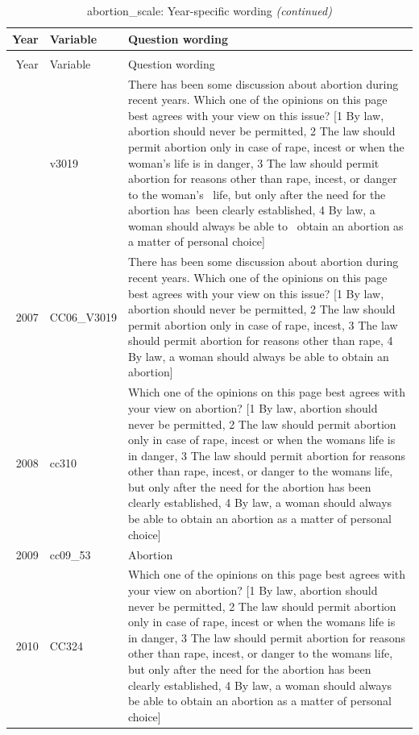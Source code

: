 \documentclass[12pt]{article}
\begin{document}
\begin{longtable}[t]{rl>{\raggedright\arraybackslash}p{10cm}}
\caption{\label{tab:unnamed-chunk-4}abortion\_scale: Year-specific wording}\\
\toprule
Year & Variable & Question wording\\
\midrule
\endfirsthead
\caption[]{abortion\_scale: Year-specific wording \textit{(continued)}}\\
\toprule
Year & Variable & Question wording\\
\midrule
\endhead
\
\endfoot
\bottomrule
\endlastfoot
2006 & v3019 & There has been some discussion about abortion during recent years.  Which one of the opinions on this page best agrees with your view on this issue? [1 By law, abortion should never be permitted, 2 The law should permit abortion only in case of rape, incest or when the woman's life is in danger, 3 The law should permit abortion for reasons other than rape, incest, or danger to the woman's  life, but only after the need for the abortion has been clearly established, 4 By law, a woman should always be able to  obtain an abortion as a matter of personal choice]\\
2007 & CC06\_V3019 & There has been some discussion about abortion during recent years. Which one of the opinions on this page best agrees with your view on this issue? [1 By law, abortion should never be permitted, 2 The law should permit abortion only in case of rape, incest, 3 The law should permit abortion for reasons other than rape, 4 By law, a woman should always be able to obtain an abortion]\\
2008 & cc310 & Which one of the opinions on this page best agrees with your view on abortion? [1 By law, abortion should never be permitted, 2 The law should permit abortion only in case of rape, incest or when the womans life is in danger, 3 The law should permit abortion for reasons other than rape, incest, or danger to the womans life, but only after the need for the abortion has been clearly established, 4 By law, a woman should always be able to obtain an abortion as a matter of personal choice]\\
2009 & cc09\_53 & Abortion\\
2010 & CC324 & Which one of the opinions on this page best agrees with your view on abortion? [1 By law, abortion should never be permitted, 2 The law should permit abortion only in case of rape, incest or when the womans life is in danger, 3 The law should permit abortion for reasons other than rape, incest, or danger to the womans life, but only after the need for the abortion has been clearly established, 4 By law, a woman should always be able to obtain an abortion as a matter of personal choice]\\

\end{longtable}
\end{document}
